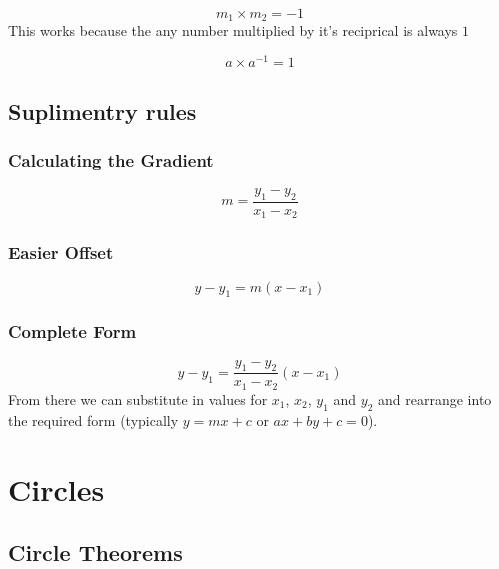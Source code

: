 \documentclass{article}
\begin{document}
\begin{equation}
	m_1 \times m_2 = -1
\end{equation}
This works because the any number multiplied by it's reciprical is always $1$

\begin{equation}
	a \times a^{-1} = 1
\end{equation}

\subsection{Suplimentry rules}

\subsubsection{Calculating the Gradient}

\begin{equation}
	m = \frac{y_1 - y_2}{x_1 - x_2}
\end{equation}

\subsubsection{Easier Offset}

\begin{equation}
	y - y_1 = m(x - x_1)
\end{equation}

\subsubsection{Complete Form}

\begin{equation}
	y - y_1 = \frac{y_1 - y_2}{x_1 - x_2}(x - x_1)
\end{equation}
From there we can substitute in values for $x_1$, $x_2$, $y_1$ and $y_2$ and rearrange into the required form
(typically $y=mx+c$ or $ax + by + c = 0$).

\section{Circles}

\subsection{Circle Theorems}

\begin{center}


\end{center}
\end{document}
